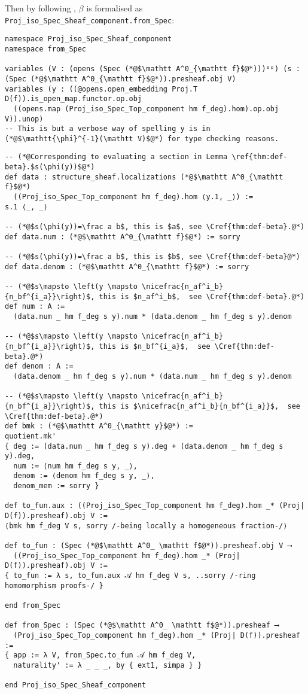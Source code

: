 \documentclass[a4paper,UKenglish,cleveref, autoref, thm-restate]{lipics-v2021}
\begin{document}
Then by following , $\beta$ is formalised as \lstinline{Proj_iso_Spec_Sheaf_component.from_Spec}:
\begin{lstlisting}
namespace Proj_iso_Spec_Sheaf_component
namespace from_Spec

variables (V : (opens (Spec (*@$\mathtt A^0_{\mathtt f}$@*)))ᵒᵖ) (s : (Spec (*@$\mathtt A^0_{\mathtt f}$@*)).presheaf.obj V)
variables (y : ((@opens.open_embedding Proj.T D(f)).is_open_map.functor.op.obj
  ((opens.map (Proj_iso_Spec_Top_component hm f_deg).hom).op.obj V)).unop)
-- This is but a verbose way of spelling y is in (*@$\mathtt{\phi}^{-1}(\mathtt V)$@*) for type checking reasons.
\end{lstlisting}
\begin{lstlisting}
-- (*@Corresponding to evaluating a section in Lemma \ref{thm:def-beta}.$s(\phi(y))$@*)
def data : structure_sheaf.localizations (*@$\mathtt A^0_{\mathtt f}$@*)
  ((Proj_iso_Spec_Top_component hm f_deg).hom ⟨y.1, _⟩) :=
s.1 ⟨_, _⟩

-- (*@$s(\phi(y))=\frac a b$, this is $a$, see \Cref{thm:def-beta}.@*)
def data.num : (*@$\mathtt A^0_{\mathtt f}$@*) := sorry

-- (*@$s(\phi(y))=\frac a b$, this is $b$, see \Cref{thm:def-beta}@*)
def data.denom : (*@$\mathtt A^0_{\mathtt f}$@*) := sorry

-- (*@$s\mapsto \left(y \mapsto \nicefrac{n_af^i_b}{n_bf^{i_a}}\right)$, this is $n_af^i_b$,  see \Cref{thm:def-beta}.@*)
def num : A :=
  (data.num _ hm f_deg s y).num * (data.denom _ hm f_deg s y).denom

-- (*@$s\mapsto \left(y \mapsto \nicefrac{n_af^i_b}{n_bf^{i_a}}\right)$, this is $n_bf^{i_a}$,  see \Cref{thm:def-beta}.@*)
def denom : A :=
  (data.denom _ hm f_deg s y).num * (data.num _ hm f_deg s y).denom

-- (*@$s\mapsto \left(y \mapsto \nicefrac{n_af^i_b}{n_bf^{i_a}}\right)$, this is $\nicefrac{n_af^i_b}{n_bf^{i_a}}$,  see \Cref{thm:def-beta}.@*)
def bmk : (*@$\mathtt A^0_{\mathtt y}$@*) :=
quotient.mk'
{ deg := (data.num _ hm f_deg s y).deg + (data.denom _ hm f_deg s y).deg,
  num := ⟨num hm f_deg s y, _⟩,
  denom := ⟨denom hm f_deg s y, _⟩,
  denom_mem := sorry }

def to_fun.aux : ((Proj_iso_Spec_Top_component hm f_deg).hom _* (Proj| D(f)).presheaf).obj V :=
⟨bmk hm f_deg V s, sorry /-being locally a homogeneous fraction-/⟩

def to_fun : (Spec (*@$\mathtt A^0_ \mathtt f$@*)).presheaf.obj V ⟶
  ((Proj_iso_Spec_Top_component hm f_deg).hom _* (Proj| D(f)).presheaf).obj V :=
{ to_fun := λ s, to_fun.aux 𝒜 hm f_deg V s, ..sorry /-ring homomorphism proofs-/ }

end from_Spec

def from_Spec : (Spec (*@$\mathtt A^0_ \mathtt f$@*)).presheaf ⟶
  (Proj_iso_Spec_Top_component hm f_deg).hom _* (Proj| D(f)).presheaf :=
{ app := λ V, from_Spec.to_fun 𝒜 hm f_deg V,
  naturality' := λ _ _ _, by { ext1, simpa } }

end Proj_iso_Spec_Sheaf_component
\end{lstlisting}
\end{document}
